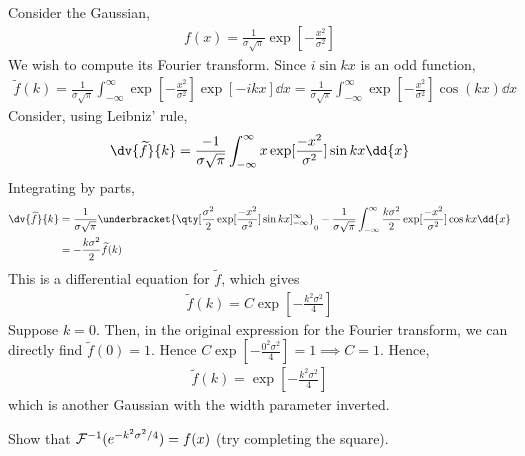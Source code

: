 \begin{example}
	Consider the Gaussian,
	\begin{align} \label{eq:8.4}
		f(x) = \frac{1}{\sigma \sqrt{\pi}} \exp[-\frac{x^2}{\sigma^2}]
	\end{align}
	We wish to compute its Fourier transform.
	Since $i \sin kx$ is an odd function,
	\begin{align*}
		\widetilde f(k) = \frac{1}{\sigma \sqrt{\pi}} \int_{-\infty}^\infty \exp[-\frac{x^2}{\sigma^2}] \exp[-ikx] \dd{x} = \frac{1}{\sigma \sqrt{\pi}} \int_{-\infty}^\infty \exp[-\frac{x^2}{\sigma^2}] \cos(kx) \dd{x}
	\end{align*}
	Consider, using Leibniz' rule,
	\begin{align*}
		\dv{\widetilde f}{k} = \frac{-1}{\sigma \sqrt{\pi}} \int_{-\infty}^\infty x\exp[\frac{-x^2}{\sigma^2}] \sin kx \dd{x}
	\end{align*}
	Integrating by parts,
	\begin{align*}
		\dv{\widetilde f}{k} & = \frac{1}{\sigma \sqrt{\pi}} \underbracket{\qty[\frac{\sigma^2}{2} \exp[\frac{-x^2}{\sigma^2}] \sin kx]_{-\infty}^\infty}_0 - \frac{1}{\sigma \sqrt{\pi}} \int_{-\infty}^\infty \frac{k\sigma^2}{2} \exp[\frac{-x^2}{\sigma^2}] \cos kx \dd{x} \\
        & = -\frac{k\sigma^2}{2} \widetilde f(k)
	\end{align*}
	This is a differential equation for $\widetilde f$, which gives
	\begin{align*}
		\widetilde f(k) = C \exp[-\frac{k^2\sigma^2}{4}]
	\end{align*}
	Suppose $k = 0$.
	Then, in the original expression for the Fourier transform, we can directly find $\widetilde f(0) = 1$.
	Hence $C \exp[-\frac{0^2\sigma^2}{4}] = 1 \implies C = 1$.
	Hence,
	\begin{align} \label{eq:8.5}
		\widetilde f(k) = \exp[-\frac{k^2\sigma^2}{4}]
	\end{align}
	which is another Gaussian with the width parameter inverted.
\end{example}

\begin{exercise}
    Show that $\mathcal{F}^{-1}(e^{-k^2 \sigma^2 / 4}) = f(x)$ (try completing the square).
\end{exercise} 

